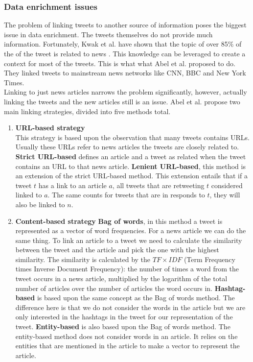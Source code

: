 \documentclass{article}
\begin{document}
\subsubsection{Data enrichment issues}
The problem of linking tweets to another source of information poses the biggest issue in data enrichment. The tweets themselves do not provide much information. Fortunately, Kwak et al. have shown that the topic of over 85\% of the of the tweet is related to news \cite{newsmedia}. This knowledge can be leveraged to create a context for most of the tweets.  This is what what Abel et al. proposed to do\cite{enrichmentForProfiling}. They linked tweets to mainstream news networks like CNN, BBC and New York Times. \\
Linking to just news articles narrows the problem significantly, however, actually linking the tweets and the new articles still is an issue. Abel et al. propose two main linking strategies, divided into five methods total.
\begin{enumerate}
\item \textbf{URL-based strategy}\\
This strategy is based upon the observation that many tweets contains URLs. Usually these URLs refer to news articles the tweets are closely related to.
	\subitem \textbf{Strict URL-based} defines an article and a tweet as related when the tweet contains an URL to that news article.
	\subitem \textbf{Lenient URL-based}, this method is an extension of the strict URL-based method. This extension entails that if a tweet $t$ has a link to an article $a$, all tweets that are retweeting $t$ considered linked to $a$. The same counts for tweets that are in responds to $t$, they will also be linked to $n$.
\item \textbf{Content-based strategy}
	\subitem \textbf{Bag of words}, in this method a tweet is represented as a vector of word frequencies. For a news article we can do the same thing. To link an article to a tweet we need to calculate the similarity between the tweet and the article and pick the one with the highest similarity. The similarity is calculated by the $TF \times IDF$ (Term Frequency times Inverse Document Frequency): the number of times a word from the tweet occurs in a news article, multiplied by the logarithm of the total number of articles over the number of articles the word occurs in. 
	\subitem \textbf{Hashtag-based} is based upon the same concept as the Bag of words method. The difference here is that we do not consider the words in the article but we are only interested in the hashtags in the tweet for our representation of the tweet.
	\subitem \textbf{Entity-based} is also based upon the Bag of words method. The entity-based method does not consider words in an article. It relies on the entities that are mentioned in the article to make a vector to represent the article. 
\end{enumerate}
\end{document}
